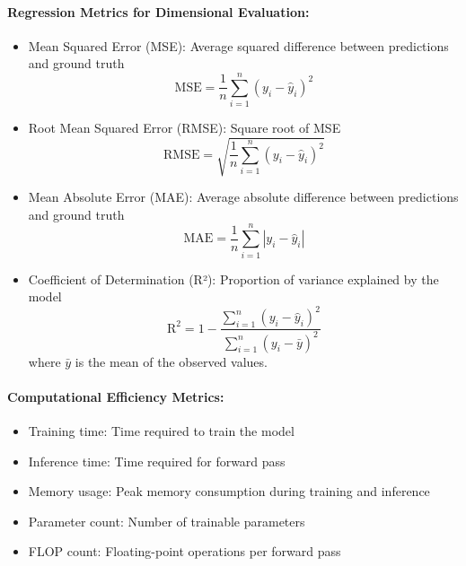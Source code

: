\documentclass[12pt]{article}
\begin{document}
\paragraph{Regression Metrics for Dimensional Evaluation:}
\begin{itemize}
    \item Mean Squared Error (MSE): Average squared difference between predictions and ground truth
    \begin{equation}
        \text{MSE} = \frac{1}{n} \sum_{i=1}^{n} (y_i - \hat{y}_i)^2
    \end{equation}
    
    \item Root Mean Squared Error (RMSE): Square root of MSE
    \begin{equation}
        \text{RMSE} = \sqrt{\frac{1}{n} \sum_{i=1}^{n} (y_i - \hat{y}_i)^2}
    \end{equation}
    
    \item Mean Absolute Error (MAE): Average absolute difference between predictions and ground truth
    \begin{equation}
        \text{MAE} = \frac{1}{n} \sum_{i=1}^{n} |y_i - \hat{y}_i|
    \end{equation}
    
    \item Coefficient of Determination (R²): Proportion of variance explained by the model
    \begin{equation}
        \text{R}^2 = 1 - \frac{\sum_{i=1}^{n} (y_i - \hat{y}_i)^2}{\sum_{i=1}^{n} (y_i - \bar{y})^2}
    \end{equation}
    where $\bar{y}$ is the mean of the observed values.
\end{itemize}

\paragraph{Computational Efficiency Metrics:}
\begin{itemize}
    \item Training time: Time required to train the model
    \item Inference time: Time required for forward pass
    \item Memory usage: Peak memory consumption during training and inference
    \item Parameter count: Number of trainable parameters
    \item FLOP count: Floating-point operations per forward pass
\end{itemize}
\end{document}
